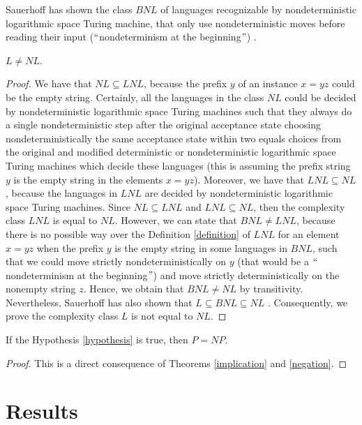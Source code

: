 \documentclass[a4paper,UKenglish,cleveref, autoref]{lipics-v2019}
\begin{document}
Sauerhoff has shown the class $BNL$ of languages recognizable by nondeterministic logarithmic space Turing machine, that only use nondeterministic moves before reading their input ($``$nondeterminism at the beginning$"$) \cite{MS03}.

\begin{theorem}
\label{negation}
$L \neq NL$.
\end{theorem}

\begin{proof}
We have that $NL \subseteq LNL$, because the prefix $y$ of an instance $x = yz$ could be the empty string. Certainly, all the languages in the class $NL$ could be decided by nondeterministic logarithmic space Turing machines such that they always do a single nondeterministic step after the original acceptance state choosing nondeterministically the same acceptance state within two equals choices from the original and modified deterministic or nondeterministic logarithmic space Turing machines which decide these languages (this is assuming the prefix string $y$ is the empty string in the elements $x = yz$). Moreover, we have that $LNL \subseteq NL$, because the languages in $LNL$ are decided by nondeterministic logarithmic space Turing machines. Since $NL \subseteq LNL$ and $LNL \subseteq NL$, then the complexity class $LNL$ is equal to $NL$. However, we can state that $BNL \neq LNL$, because there is no possible way over the Definition \ref{definition} of $LNL$ for an element $x = yz$ when the prefix $y$ is the empty string in some languages in $BNL$, such that we could move strictly nondeterministically on $y$ (that would be a $``$nondeterminism at the beginning$"$) and move strictly deterministically on the nonempty string $z$. Hence, we obtain that $BNL \neq NL$ by transitivity. Nevertheless, Sauerhoff has also shown that $L \subseteq BNL \subseteq NL$ \cite{MS03}. Consequently, we prove the complexity class $L$ is not equal to $NL$.
\end{proof}

\begin{theorem}
\label{argument}
If the Hypothesis \ref{hypothesis} is true, then $P = NP$.
\end{theorem}

\begin{proof}
This is a direct consequence of Theorems \ref{implication} and \ref{negation}.
\end{proof}

\section{Results}
\end{document}
